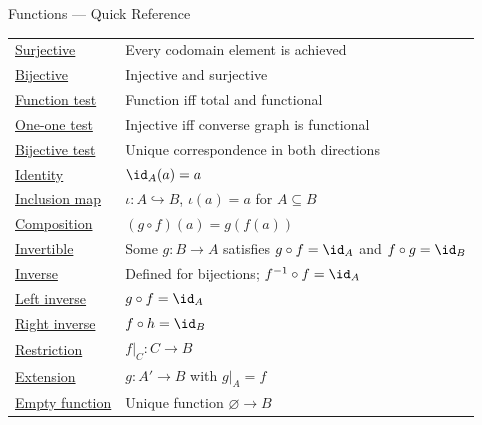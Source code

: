 \begin{toolkitbox}{Functions --- Quick Reference}
\begin{tabular}{l l}
\hyperref[def:surjective]{Surjective}         & Every codomain element is achieved                          \\
\hyperref[def:bijective]{Bijective}          & Injective and surjective                                    \\
\midrule
\hyperref[thm:function-total-functional-characterization]{Function test}      & Function iff total and functional                           \\
\hyperref[prop:one-to-one-converse-functional]{One-one test}       & Injective iff converse graph is functional                  \\
\hyperref[prop:bijection-unique-both-directions]{Bijective test}     & Unique correspondence in both directions                    \\
\midrule
\hyperref[def:identity]{Identity}           & $\id_A(a) = a$                                              \\
\hyperref[def:inclusion]{Inclusion map}      & $\iota : A \hookrightarrow B$, $\iota(a) = a$ for $A \subseteq B$ \\
\hyperref[def:composition]{Composition}        & $(g \circ f)(a) = g(f(a))$                                  \\
\hyperref[def:invertible-function]{Invertible}       & Some $g:B\to A$ satisfies $g\circ f=\id_A$ and $f\circ g=\id_B$ \\
\hyperref[def:inverse]{Inverse}            & Defined for bijections; $f^{-1} \circ f = \id_A$            \\
\hyperref[def:left-inverse-function]{Left inverse}       & $g\circ f=\id_A$                                           \\
\hyperref[def:right-inverse-function]{Right inverse}      & $f\circ h=\id_B$                                           \\
\hyperref[def:restriction]{Restriction}        & $f|_C : C \to B$                                            \\
\hyperref[def:fn-extension]{Extension}          & $g : A' \to B$ with $g|_A = f$                              \\
\hyperref[def:empty-function]{Empty function}     & Unique function $\varnothing\to B$                          \\
\bottomrule
\end{tabular}
\end{toolkitbox}



